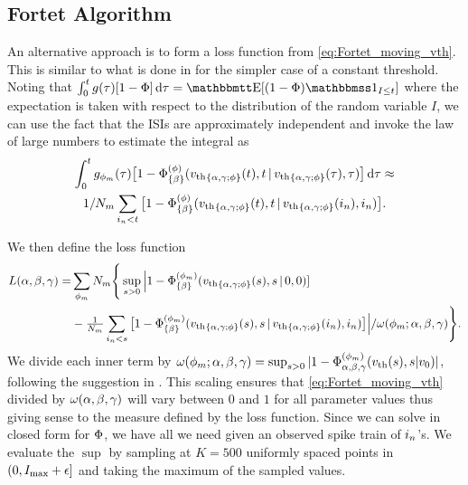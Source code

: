 \subsection{Fortet Algorithm}
An alternative approach is to form a loss function from
\cref{eq:Fortet_moving_vth}. This is similar to what is done in
\cite{Ditlevsen2008,Ditlevsen2007} for the simpler case of a constant threshold.
Noting that $\int_0^t g (\t) [1-\F ] \intd{\t} = \Exp[ (1 - \F ) \charf_{I \leq
t} ]$ where the expectation is taken with respect to the distribution of the
random variable $I$, we can use the fact that the ISIs are approximately
independent and invoke the law of large numbers to estimate the integral as
\begin{multline*}
\int_0^t g_{\phi_m}({\tau}) 
\big[1-{\Phi}^{(\phi)}_{\{\beta\}}({ v_{\textrm{th} } }_{\{\alpha,{\gamma };\phi\}}(t),  t \,|\,
{ v_{\textrm{th} } }_{\{\alpha,{\gamma };\phi\}}({\tau}), {\tau}) \big] \, \mathrm{d} {\tau} \approx 
\\
1/N_m \sum_{{ i_n} < t} 
\big[1
- {\Phi}^{(\phi)}_{\{\beta\}}({ v_{\textrm{th} } }_{\{\alpha,{\gamma };\phi\}}(t), t \,|\,
{ v_{\textrm{th} } }_{\{\alpha,{\gamma };\phi\}}({ i_n}),{ i_n} )\big].
\end{multline*}


We then define the loss function
\begin{align}
L(\alpha,\beta,{\gamma }) =& 
\sum_{\phi_m} N_m \Bigg\{ 
\sup_{s > 0}
		 \Big| 1 - {\Phi}^{(\phi_m)}_{\{\beta\}}({ v_{\textrm{th} } }_{\{\alpha,{\gamma };\phi\}}(s), s \,|\,0,0) ] 
		 \notag
\\
		 &-  \tfrac{1}{N_m}\sum_{{ i_n} < s}
		 \big[1 - {\Phi}^{(\phi_m)}_{\{\beta\}}({ v_{\textrm{th} } }_{\{\alpha,{\gamma };\phi\}}(s),s  \,|\,
		 { v_{\textrm{th} } }_{\{\alpha,{\gamma };\phi\}}({ i_n}), { i_n}) \big] \Big| / \omega(\phi_m; \alpha,\beta,{\gamma })
		   \Bigg\}.
\label{eq:loss_function_fortet}
\end{align}
We divide each inner term by $\omega(\phi_m; \alpha,\beta,{\gamma }) =
\sup_{s > 0} |1 - {\Phi}^{(\phi_m)}_{{\alpha,\beta,{\gamma } }}({ v_{\textrm{th} } }(s), s|v_0) |$,
following the suggestion in
\cite{Ditlevsen2007}. This scaling ensures that \cref{eq:Fortet_moving_vth}
divided by $\omega(\alpha,\beta,{\gamma })$ will vary between $0$ and $1$ for all parameter
values thus giving sense to the measure defined by the loss
function. Since we can solve in closed form for ${\Phi}$, we have all we
need given an observed spike train of 
${ i_n}$'s. We evaluate the $\sup$ by sampling at 
$K=500$ uniformly spaced points in $(0, I_{\max} + {\epsilon}]$ and taking the maximum
of the sampled values. 


